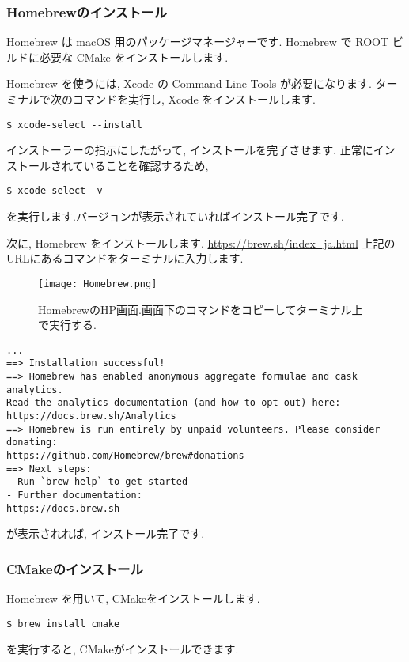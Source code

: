 \subsubsection{Homebrewのインストール}
Homebrew は macOS 用のパッケージマネージャーです.
Homebrew で ROOT ビルドに必要な CMake をインストールします.\par
Homebrew を使うには, Xcode の Command Line Tools が必要になります.
ターミナルで次のコマンドを実行し, Xcode をインストールします.
\begin{lstlisting}
$ xcode-select --install
\end{lstlisting}
インストーラーの指示にしたがって, インストールを完了させます.
正常にインストールされていることを確認するため, 
\begin{lstlisting}
$ xcode-select -v
\end{lstlisting}
を実行します.バージョンが表示されていればインストール完了です.\par
次に, Homebrew をインストールします.
\url{https://brew.sh/index_ja.html}
上記のURLにあるコマンドをターミナルに入力します.
\begin{figure}[H]
    \centering
    \texttt{[image: Homebrew.png]}
    \caption{HomebrewのHP画面.画面下のコマンドをコピーしてターミナル上で実行する.}
\end{figure}
\begin{lstlisting}[caption=Homebrewインストール時のスクリプト]
...
==> Installation successful!
==> Homebrew has enabled anonymous aggregate formulae and cask analytics.
Read the analytics documentation (and how to opt-out) here:
https://docs.brew.sh/Analytics
==> Homebrew is run entirely by unpaid volunteers. Please consider donating:
https://github.com/Homebrew/brew#donations
==> Next steps:
- Run `brew help` to get started
- Further documentation:
https://docs.brew.sh
\end{lstlisting}
が表示されれば, インストール完了です.\par

\subsubsection{CMakeのインストール}
Homebrew を用いて, CMakeをインストールします.
\begin{lstlisting}
$ brew install cmake
\end{lstlisting}
を実行すると, CMakeがインストールできます.

